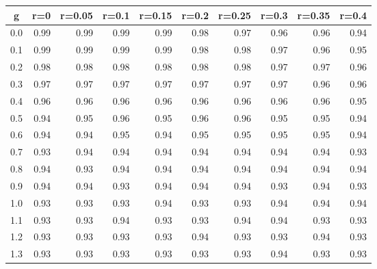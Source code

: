 %
\begin{table}[!tbp]
 \begin{center}
 \begin{tabular}{rrrrrrrrrr}\hline\hline
\multicolumn{1}{c}{g}&\multicolumn{1}{c}{r=0}&\multicolumn{1}{c}{r=0.05}&\multicolumn{1}{c}{r=0.1}&\multicolumn{1}{c}{r=0.15}&\multicolumn{1}{c}{r=0.2}&\multicolumn{1}{c}{r=0.25}&\multicolumn{1}{c}{r=0.3}&\multicolumn{1}{c}{r=0.35}&\multicolumn{1}{c}{r=0.4}\tabularnewline
\hline
0.0&0.99&0.99&0.99&0.99&0.98&0.97&0.96&0.96&0.94\tabularnewline
0.1&0.99&0.99&0.99&0.99&0.98&0.98&0.97&0.96&0.95\tabularnewline
0.2&0.98&0.98&0.98&0.98&0.98&0.98&0.97&0.97&0.96\tabularnewline
0.3&0.97&0.97&0.97&0.97&0.97&0.97&0.97&0.96&0.96\tabularnewline
0.4&0.96&0.96&0.96&0.96&0.96&0.96&0.96&0.96&0.95\tabularnewline
0.5&0.94&0.95&0.96&0.95&0.96&0.96&0.95&0.95&0.94\tabularnewline
0.6&0.94&0.94&0.95&0.94&0.95&0.95&0.95&0.95&0.94\tabularnewline
0.7&0.93&0.94&0.94&0.94&0.94&0.94&0.94&0.94&0.93\tabularnewline
0.8&0.94&0.93&0.94&0.94&0.94&0.94&0.94&0.94&0.94\tabularnewline
0.9&0.94&0.94&0.93&0.94&0.94&0.94&0.93&0.94&0.93\tabularnewline
1.0&0.93&0.93&0.93&0.94&0.93&0.93&0.94&0.94&0.94\tabularnewline
1.1&0.93&0.93&0.94&0.93&0.93&0.94&0.94&0.93&0.93\tabularnewline
1.2&0.93&0.93&0.93&0.93&0.94&0.93&0.93&0.94&0.93\tabularnewline
1.3&0.93&0.93&0.93&0.93&0.93&0.93&0.94&0.93&0.93\tabularnewline
\hline
\end{tabular}

\end{center}

\end{table}

